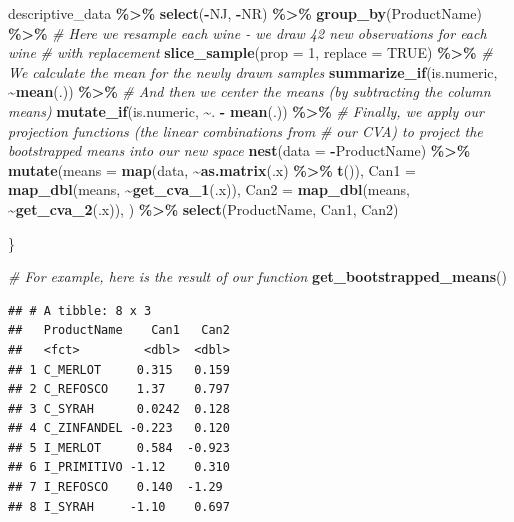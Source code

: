 \documentclass[
]{book}
\newenvironment{Shaded}{\begin{snugshade}}{\end{snugshade}}
\newcommand{\AttributeTok}[1]{\textcolor[rgb]{0.13,0.29,0.53}{#1}}
\newcommand{\CommentTok}[1]{\textcolor[rgb]{0.56,0.35,0.01}{\textit{#1}}}
\newcommand{\ConstantTok}[1]{\textcolor[rgb]{0.56,0.35,0.01}{#1}}
\newcommand{\DecValTok}[1]{\textcolor[rgb]{0.00,0.00,0.81}{#1}}
\newcommand{\FunctionTok}[1]{\textcolor[rgb]{0.13,0.29,0.53}{\textbf{#1}}}
\newcommand{\NormalTok}[1]{#1}
\newcommand{\SpecialCharTok}[1]{\textcolor[rgb]{0.81,0.36,0.00}{\textbf{#1}}}
\begin{document}
\begin{Shaded}
\begin{Highlighting}[]
\NormalTok{  descriptive\_data }\SpecialCharTok{\%\textgreater{}\%}
  \FunctionTok{select}\NormalTok{(}\SpecialCharTok{{-}}\NormalTok{NJ, }\SpecialCharTok{{-}}\NormalTok{NR) }\SpecialCharTok{\%\textgreater{}\%}
  \FunctionTok{group\_by}\NormalTok{(ProductName) }\SpecialCharTok{\%\textgreater{}\%}
    \CommentTok{\# Here we resample each wine {-} we draw 42 new observations for each wine}
    \CommentTok{\# with replacement}
  \FunctionTok{slice\_sample}\NormalTok{(}\AttributeTok{prop =} \DecValTok{1}\NormalTok{, }\AttributeTok{replace =} \ConstantTok{TRUE}\NormalTok{) }\SpecialCharTok{\%\textgreater{}\%}
    \CommentTok{\# We calculate the mean for the newly drawn samples}
  \FunctionTok{summarize\_if}\NormalTok{(is.numeric, }\SpecialCharTok{\textasciitilde{}}\FunctionTok{mean}\NormalTok{(.)) }\SpecialCharTok{\%\textgreater{}\%} 
    \CommentTok{\# And then we center the means (by subtracting the column means)}
  \FunctionTok{mutate\_if}\NormalTok{(is.numeric, }\SpecialCharTok{\textasciitilde{}}\NormalTok{. }\SpecialCharTok{{-}} \FunctionTok{mean}\NormalTok{(.)) }\SpecialCharTok{\%\textgreater{}\%}
    \CommentTok{\# Finally, we apply our projection functions (the linear combinations from}
    \CommentTok{\# our CVA) to project the bootstrapped means into our new space}
  \FunctionTok{nest}\NormalTok{(}\AttributeTok{data =} \SpecialCharTok{{-}}\NormalTok{ProductName) }\SpecialCharTok{\%\textgreater{}\%}
  \FunctionTok{mutate}\NormalTok{(}\AttributeTok{means =} \FunctionTok{map}\NormalTok{(data, }\SpecialCharTok{\textasciitilde{}}\FunctionTok{as.matrix}\NormalTok{(.x) }\SpecialCharTok{\%\textgreater{}\%} \FunctionTok{t}\NormalTok{()),}
         \AttributeTok{Can1 =} \FunctionTok{map\_dbl}\NormalTok{(means, }\SpecialCharTok{\textasciitilde{}}\FunctionTok{get\_cva\_1}\NormalTok{(.x)),}
         \AttributeTok{Can2 =} \FunctionTok{map\_dbl}\NormalTok{(means, }\SpecialCharTok{\textasciitilde{}}\FunctionTok{get\_cva\_2}\NormalTok{(.x)),}
\NormalTok{         ) }\SpecialCharTok{\%\textgreater{}\%}
    \FunctionTok{select}\NormalTok{(ProductName, Can1, Can2)}
  
\NormalTok{\}}

\CommentTok{\# For example, here is the result of our function}
\FunctionTok{get\_bootstrapped\_means}\NormalTok{()}
\end{Highlighting}
\end{Shaded}

\begin{verbatim}
## # A tibble: 8 x 3
##   ProductName    Can1   Can2
##   <fct>         <dbl>  <dbl>
## 1 C_MERLOT     0.315   0.159
## 2 C_REFOSCO    1.37    0.797
## 3 C_SYRAH      0.0242  0.128
## 4 C_ZINFANDEL -0.223   0.120
## 5 I_MERLOT     0.584  -0.923
## 6 I_PRIMITIVO -1.12    0.310
## 7 I_REFOSCO    0.140  -1.29 
## 8 I_SYRAH     -1.10    0.697
\end{verbatim}
\end{document}
